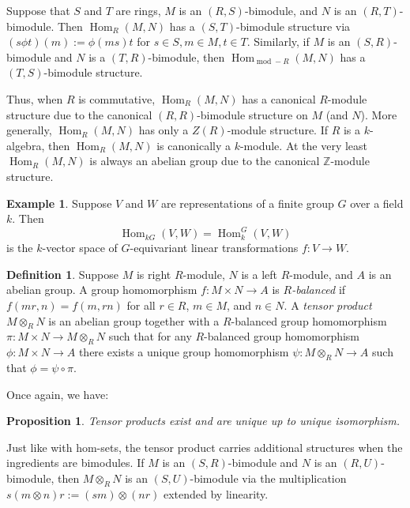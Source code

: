 \documentclass[12pt]{article}
\theoremstyle{plain}
\newtheorem{proposition}[theorem]{Proposition}
\theoremstyle{definition}
\newtheorem{definition}[theorem]{Definition}
\newtheorem{example}[theorem]{Example}
\theoremstyle{remark}
\numberwithin{equation}{section}
\begin{document}
Suppose that $S$ and $T$ are rings,
$M$ is an $(R,S)$-bimodule, and $N$ is an $(R,T)$-bimodule.
Then $\operatorname{Hom}_R(M,N)$ has a $(S,T)$-bimodule structure
via $(s\phi t)(m):=\phi(ms)t$ for $s \in S, m \in M, t\in T$.
Similarly, if $M$ is an $(S,R)$-bimodule and $N$ is a $(T,R)$-bimodule,
then $\operatorname{Hom}_{\operatorname{mod}-R}(M,N)$
has a $(T,S)$-bimodule structure.

Thus, when $R$ is commutative, $\operatorname{Hom}_R(M,N)$
has a canonical $R$-module structure due to the canonical
$(R,R)$-bimodule structure on $M$ (and $N$).
More generally, $\operatorname{Hom}_R(M,N)$ has only a $Z(R)$-module
structure.
If $R$ is a $k$-algebra, then $\operatorname{Hom}_R(M,N)$
is canonically a $k$-module.
At the very least $\operatorname{Hom}_R(M,N)$ is always an
abelian group due to the canonical $\mathbb{Z}$-module structure.

\begin{example}
Suppose $V$ and $W$ are representations of a finite group $G$
over a field $k$.
Then
\[
\operatorname{Hom}_{kG}(V,W) = \operatorname{Hom}^G_k(V,W)
\]
is the $k$-vector space of $G$-equivariant linear transformations
$f : V \to W$.
\end{example}

\begin{definition}
Suppose $M$ is right $R$-module, $N$ is a left $R$-module,
and $A$ is an abelian group.
A group homomorphism $f: M \times N \to A$ is \emph{$R$-balanced}
if $f(mr,n)=f(m,rn)$ for all $r \in R$, $m \in M$, and $n \in N$.
A \emph{tensor product} $M \otimes_R N$ is an abelian group
together with a $R$-balanced group homomorphism
$\pi : M \times N \to M \otimes_R N$ such that
for any $R$-balanced group homomorphism
$\phi : M \times N \to A$ there exists a unique
group homomorphism $\psi :  M \otimes_R N \to A$
such that $\phi = \psi \circ \pi$.
\end{definition}

Once again, we have:

\begin{proposition}
Tensor products exist and are unique up to unique isomorphism.
\end{proposition}

Just like with hom-sets, the tensor product carries additional
structures when the ingredients are bimodules.
If $M$ is an $(S,R)$-bimodule and $N$ is an $(R,U)$-bimodule,
then $M \otimes_R N$ is an $(S,U)$-bimodule via the multiplication
$s(m\otimes n)r := (sm) \otimes (nr)$ extended by linearity.
\end{document}
